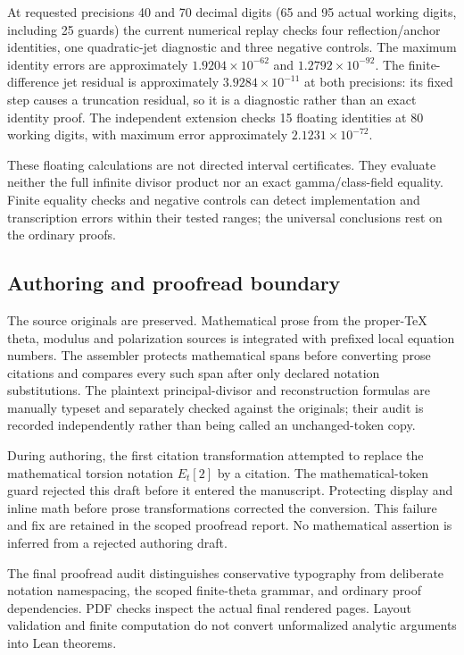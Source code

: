 At requested precisions 40 and 70 decimal digits (65 and 95 actual working digits, including 25 guards) the current numerical replay checks four reflection/anchor identities, one quadratic-jet diagnostic and three negative controls. The maximum identity errors are approximately $1.9204\times10^{-62}$ and $1.2792\times10^{-92}$. The finite-difference jet residual is approximately $3.9284\times10^{-11}$ at both precisions: its fixed step causes a truncation residual, so it is a diagnostic rather than an exact identity proof. The independent extension checks 15 floating identities at 80 working digits, with maximum error approximately $2.1231\times10^{-72}$.

These floating calculations are not directed interval certificates. They evaluate neither the full infinite divisor product nor an exact gamma/class-field equality. Finite equality checks and negative controls can detect implementation and transcription errors within their tested ranges; the universal conclusions rest on the ordinary proofs.

\subsection{Authoring and proofread boundary}
The source originals are preserved. Mathematical prose from the proper-TeX theta, modulus and polarization sources is integrated with prefixed local equation numbers. The assembler protects mathematical spans before converting prose citations and compares every such span after only declared notation substitutions. The plaintext principal-divisor and reconstruction formulas are manually typeset and separately checked against the originals; their audit is recorded independently rather than being called an unchanged-token copy.

During authoring, the first citation transformation attempted to replace the mathematical torsion notation $E_t[2]$ by a citation. The mathematical-token guard rejected this draft before it entered the manuscript. Protecting display and inline math before prose transformations corrected the conversion. This failure and fix are retained in the scoped proofread report. No mathematical assertion is inferred from a rejected authoring draft.

The final proofread audit distinguishes conservative typography from deliberate notation namespacing, the scoped finite-theta grammar, and ordinary proof dependencies. PDF checks inspect the actual final rendered pages. Layout validation and finite computation do not convert unformalized analytic arguments into Lean theorems.
